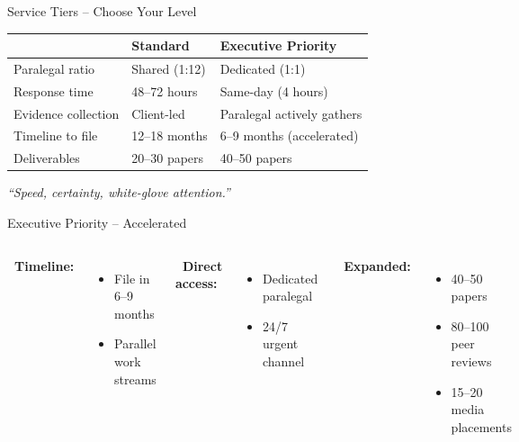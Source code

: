 \documentclass[aspectratio=169, 10pt]{beamer}
\begin{document}
	\begin{frame}{Service Tiers – Choose Your Level}
		\begin{table}
			\centering
			\scriptsize
			\begin{tabular}{p{2.2cm}p{2.5cm}p{2.5cm}}
				\toprule
				& \textbf{Standard} & \textbf{Executive Priority} \\
				\midrule
				Paralegal ratio & Shared (1:12) & Dedicated (1:1) \\
				Response time & 48–72 hours & Same-day (4 hours) \\
				Evidence collection & Client-led & Paralegal actively gathers \\
				Timeline to file & 12–18 months & 6–9 months (accelerated) \\
				Deliverables & 20–30 papers & 40–50 papers \\
				\bottomrule
			\end{tabular}
		\end{table}
		\centering
		\vspace{0.3cm}
		\textcolor{premiumpurple}{\textit{“Speed, certainty, white-glove attention.”}}
	\end{frame}
	
	\begin{frame}{Executive Priority – Accelerated}
		\begin{columns}[T]
			\textbf{\faRocket \ Timeline:}
			\begin{itemize}
				\item File in 6–9 months
				\item Parallel work streams
			\end{itemize}
			
			\textbf{\faHeadset \ Direct access:}
			\begin{itemize}
				\item Dedicated paralegal
				\item 24/7 urgent channel
			\end{itemize}
			
			\textbf{\faTrophy \ Expanded:}
			\begin{itemize}
				\item 40–50 papers
				\item 80–100 peer reviews
				\item 15–20 media placements
			\end{itemize}
		\end{columns}
	\end{frame}
	
\end{document}
